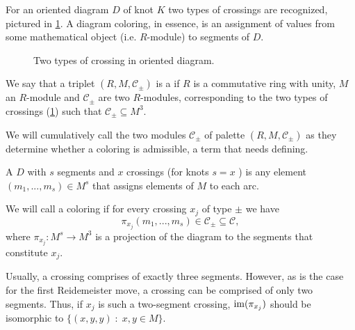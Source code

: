 For an oriented diagram $D$ of knot $K$ two types of crossings are recognized, pictured in \cref{crossing_type}. A diagram coloring, in essence, is an assignment of values from some mathematical object (i.e. $R$-module) to segments of $D$.

\begin{figure}[h]\centering
  \caption{Two types of crossing in oriented diagram.\label{crossing_type}}
\end{figure}

\begin{definition}[palette]
  We say that a triplet {\boldmath$(R, M, \mathcal{C}_\pm)$} is a  if $R$ is a commutative ring with unity, $M$ an $R$-module and $\mathcal{C}_\pm$ are two $R$-modules, corresponding to the two types of crossings (\cref{crossing_type}) such that $\mathcal{C}_\pm\subseteq M^3$.
\end{definition}

We will cumulatively call the two modules $\mathcal{C}_\pm$  of palette $(R, M, \mathcal{C}_\pm)$ as they determine whether a coloring is admissible, a term that needs defining.

\begin{definition}
  A  $D$ with $s$ segments and $x$ crossings (for knots $s=x$ \cite{julia_private}) is any element $(m_1,..., m_s)\in M^s$ that assigns elements of $M$ to each arc. 

  We will call a coloring  if for every crossing $x_j$ of type $\pm$ we have 
  $$\pi_{x_j}(m_1,..., m_s)\in \mathcal{C}_\pm\subseteq\mathcal{C},$$
  where $\pi_{x_j}:M^s\to M^3$ is a projection of the diagram to the segments that constitute $x_j$. 
\end{definition}

Usually, a crossing comprises of exactly three segments. However, as is the case for the first Reidemeister move, a crossing can be comprised of only two segments. Thus, if $x_j$ is such a two-segment crossing, $\operatorname{im}(\pi_{x_j})$ should be isomorphic to $\{(x, y, y)\;:\;x,y\in M\}$.

